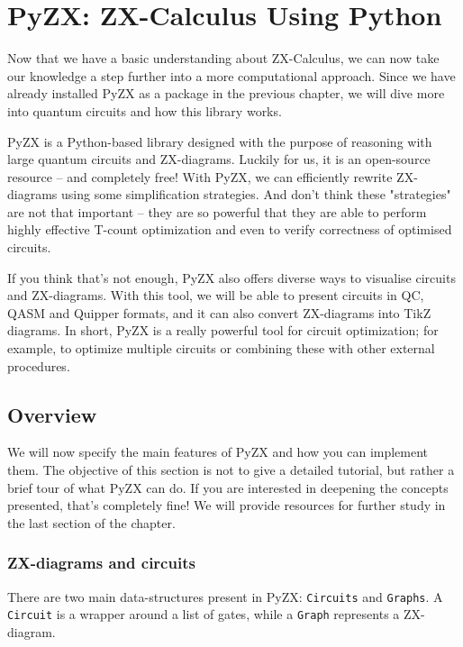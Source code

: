 \chapter{PyZX: ZX-Calculus Using Python}
\label{ch:pyzx}

Now that we have a basic understanding about ZX-Calculus, we can now take our knowledge a step further into a more computational approach. Since we have already installed PyZX as a package in the previous chapter, we will dive more into quantum circuits and how this library works.

\large{PyZX} is a Python-based library designed with the purpose of reasoning with large {quantum circuits} and {ZX-diagrams}. Luckily for us, it is  an open-source resource -- and completely free! With PyZX, we can efficiently rewrite ZX-diagrams using some simplification strategies. And don't think these "strategies" are not that important -- they are so powerful that they are able to perform highly effective T-count optimization and even to verify correctness of optimised circuits. 

If you think that's {not enough}, PyZX also offers diverse ways to visualise circuits and ZX-diagrams. With this tool, we will be able to present circuits in QC, QASM and Quipper formats, and it can also convert ZX-diagrams into TikZ diagrams. In short, PyZX is a really powerful tool for circuit optimization; for example, to optimize multiple circuits or combining these with other external procedures. 

\section{Overview}
We will now specify the main features of PyZX and how you can implement them. The objective of this section is not to give a detailed tutorial, but rather a brief tour of what PyZX can do. If you are interested in deepening the concepts presented, that's completely fine! We will provide resources for further study in the last section of the chapter. 

\subsection{ZX-diagrams and circuits}
There are two main data-structures present in PyZX: \texttt{Circuits} and \texttt{Graphs}. A \texttt{Circuit} is a wrapper around a list of gates, while a \texttt{Graph} represents a ZX-diagram.

